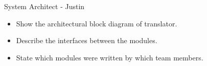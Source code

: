 System Architect - Justin
\begin{itemize}
\item Show the architectural block diagram of translator.
\item Describe the interfaces between the modules.
\item State which modules were written by which team members.
\end{itemize}
